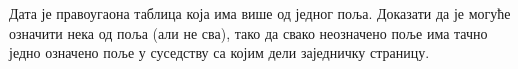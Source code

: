 Дата је правоугаона таблица која има више од једног поља. 
Доказати да је могуће означити нека од поља (али не сва), тако да свако
неозначено поље има тачно једно означено поље у суседству са којим дели
заједничку страницу. 

\solution

